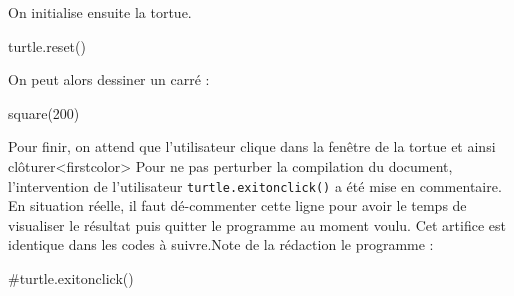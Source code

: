 \begin{exercise}[title=Dessin de carré, level=intermediate]
On initialise ensuite la tortue.


\begin{idleconsole}
\begin{pyconsole}
turtle.reset()
\end{pyconsole}
\end{idleconsole}

On peut alors dessiner un carré :


\begin{idleconsole}
\begin{pyconsole}
square(200)
\end{pyconsole}
\end{idleconsole}

Pour finir, on attend que l'utilisateur clique dans la fenêtre de la tortue et ainsi clôturer\caution[b]<firstcolor>{%
Pour ne pas perturber la compilation du document, l'intervention de l'utilisateur \texttt{turtle.exitonclick()} a été mise en commentaire. En situation réelle, il faut dé-commenter cette ligne pour avoir le temps de visualiser le résultat puis quitter le programme au moment voulu. Cet artifice est identique dans les codes à suivre.}{Note de la rédaction} le programme :

%

\begin{idleconsole}
\begin{pyconsole}
#turtle.exitonclick()
\end{pyconsole}
\end{idleconsole}

\end{exercise}



